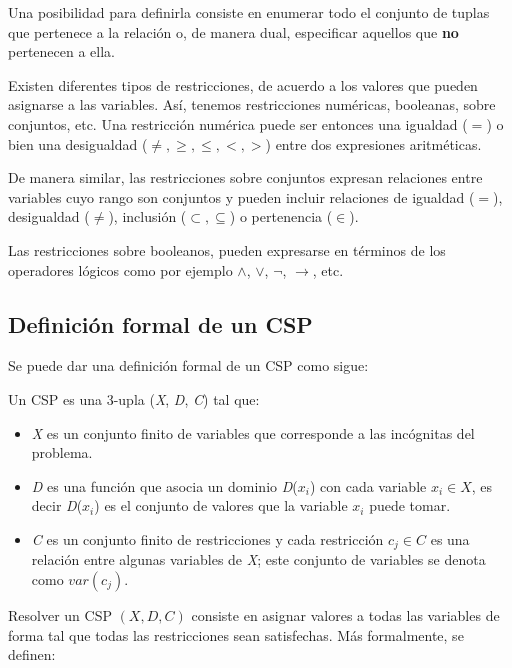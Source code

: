 \documentclass{llncs}
\begin{document}
      Una posibilidad para definirla consiste en enumerar todo el conjunto de tuplas que pertenece a la relación o,
      de manera dual, especificar aquellos que \textbf{no} pertenecen a ella.
      
      Existen diferentes tipos de restricciones, de acuerdo a los valores que pueden asignarse a las variables. Así,
      tenemos restricciones numéricas, booleanas, sobre conjuntos, etc. Una restricción numérica puede ser entonces
      una igualdad ($=$) o bien una desigualdad ($\neq, \geq, \leq, <, >$) entre dos expresiones aritméticas.
      
      De manera similar, las restricciones sobre conjuntos expresan relaciones entre variables cuyo rango son conjuntos y pueden
      incluir relaciones de igualdad ($=$), desigualdad ($\neq$), inclusión ($\subset, \subseteq$) o pertenencia ($\in$).
      
      Las restricciones sobre booleanos, pueden expresarse en términos de los operadores
      lógicos como por ejemplo $\wedge$, $\lor$, $\neg$, $\rightarrow$, etc.
      
    \subsection{Definición formal de un CSP}
    \label{subsec:cspformal}
      Se puede dar una definición formal de un CSP como sigue:
      
      Un CSP es una 3-upla (\textit{X}, \textit{D}, \textit{C}) tal que:
      \begin{itemize}
        \item \textit{X} es un conjunto finito de variables que corresponde a las incógnitas del problema.
        \item \textit{D} es una función que asocia un dominio \textit{D}($x_i$) con cada variable $x_i \in \textit{X}$, es
        decir \textit{D}($x_i$) es el conjunto de valores que la variable $x_i$ puede tomar.
        \item \textit{C} es un conjunto finito de restricciones y cada restricción $c_j \in C$ es una relación entre
        algunas variables de \textit{X}; este conjunto de variables se denota como $var(c_j).$
      \end{itemize}
  
  	Resolver un CSP $(X, D, C)$ consiste en asignar valores a todas las variables de forma tal
  	que todas las restricciones sean satisfechas. Más formalmente, se definen:
  	
\end{document}
